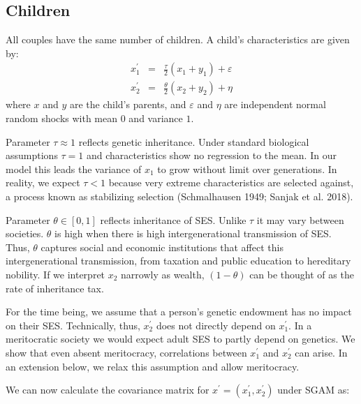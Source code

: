 \documentclass[
]{article}
\theoremstyle{definition}
\theoremstyle{definition}
\theoremstyle{definition}
\theoremstyle{definition}
\theoremstyle{remark}
\begin{document}
\hypertarget{children}{%
\subsection{Children}\label{children}}

All couples have the same number of children. A child's characteristics are
given by:
\begin{eqnarray}
x_{1}^{\prime } &=&\frac{\tau }{2}\left( x_{1}+y_{1}\right) +\varepsilon
\label{Chil} \\
x_{2}^{\prime } &=&\frac{\theta }{2}\left( x_{2}+y_{2}\right) +\eta 
\nonumber
\end{eqnarray}
where \(x\) and \(y\) are the child's parents, and \(\varepsilon\) and \(\eta\) are
independent normal random shocks with mean \(0\) and variance \(1\).

Parameter \(\tau \approx 1\) reflects genetic inheritance. Under standard biological
assumptions \(\tau = 1\) and characteristics show no regression to the mean. In our
model this leads the variance of \(x_1\) to grow without limit over generations.
In reality, we expect \(\tau < 1\) because very extreme characteristics are
selected against, a process known as stabilizing selection
(Schmalhausen 1949; Sanjak et al. 2018).

Parameter \(\theta \in [0, 1]\) reflects inheritance of SES. Unlike \(\tau\) it may vary
between societies. \(\theta\) is high when there is high intergenerational
transmission of SES. Thus, \(\theta\) captures social and economic institutions
that affect this intergenerational transmission, from taxation and
public education to hereditary nobility. If we interpret \(x_2\) narrowly as
wealth, \((1 - \theta)\) can be thought of as the rate of inheritance tax.

For the time being, we assume that a person's genetic endowment has no impact on
their SES. Technically, thus, \(x_{2}^\prime\) does not directly depend on
\(x_{1}^\prime\). In a meritocratic society we would expect adult SES to partly depend
on genetics. We show that even absent meritocracy, correlations between \(x_1^\prime\) and
\(x_{2}^\prime\) can arise. In an extension below, we relax this assumption and allow
meritocracy.

We can now calculate the covariance matrix for
\(x^\prime = (x_{1}^{\prime }, x_{2}^{\prime })\) under SGAM as:
\end{document}
